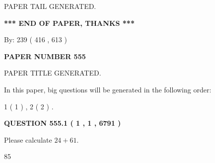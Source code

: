 \documentclass[12pt]{article}
\begin{document}
   
   
\vspace{2.0in} PAPER TAIL GENERATED.
   
   
   
   
\vspace{1.0in} 
{\textbf{\large{ *** END OF PAPER, THANKS *** }}} 
   
   
\hspace{1.0in} By: 
 239 ( 416 ,  613 )
   
   
   
   
\newpage 
\setcounter{page}{ 
   555001 } 
   
   
   
   
 {\textbf{ \Large{ PAPER NUMBER  555  }}}
   
   
\vspace{0.2in}
   
   
   
   
   
   
   
   
 \vspace{0.2in}
 
 
 
 
   
   
 PAPER TITLE GENERATED.
   
   
   
\vspace{0.2in}
   
In this paper, big questions will be generated in the following order: 
   
   
   1 ( 1 )
 ,
   2 ( 2 )
 .
  
\vspace{0.2in}
  
{\textbf{\Large{QUESTION
555.1 
 ( 1 , 1 , 6791 )
}}}
  
  
 
Please calculate $ %
24 +  %
61 $.
 
 
 
\noindent{}
 
 

85
 
 
\noindent{}
 
 

 
 
 
\noindent{}
 
\end{document}

